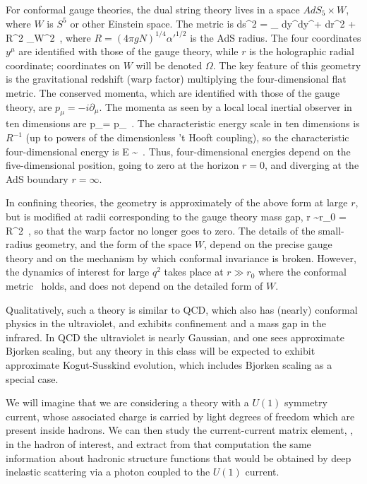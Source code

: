 For conformal gauge theories, the dual string theory lives in a space $AdS_5
\times W$, where $W$ is $S^5$ or other Einstein space.  The metric is
ds^2 =  \eta_{\mu\nu} dy^\mu dy^\nu + dr^2 + R^2
_W^2\ ,
\ee
where $R = (4\pi gN)^{1/4}
\alpha'^{1/2}$ is the AdS radius.  The four coordinates $y^\mu$ are
identified with those of the gauge theory, while $r$ is the holographic radial
coordinate; coordinates on $W$ will be denoted $\Omega$.  The key feature of
this geometry is the gravitational redshift (warp factor) multiplying the
four-dimensional flat metric.  The conserved momenta, which are identified
with those of the gauge theory, are $p_\mu = -i
\partial_\mu$.  The momenta as seen by a local local inertial observer in ten
dimensions are
\tilde p_\mu =  p_\mu\ .
\ee
The characteristic energy scale in ten dimensions is $R^{-1}$ (up to powers
of the dimensionless 't Hooft coupling), so the characteristic
four-dimensional energy is
E \sim {}\ .
\ee
Thus, four-dimensional energies depend on the five-dimensional position,
going to zero at the horizon $r = 0$, and diverging at the AdS boundary
$r = \infty$.

In confining theories, the geometry is approximately of the above form at
large $r$, but is modified at radii corresponding to the gauge theory mass
gap,
r \sim r_0 = \Lambda R^2\ ,
\ee
so that the warp factor no longer goes to zero.
The details of the small-radius geometry, and the form of the
space $W$, depend on the precise gauge theory and on the mechanism by which
conformal invariance is broken.  However, the dynamics of interest for large
$q^2$ takes place at $r \gg r_0$ where the conformal
metric~ holds, and does not depend on the detailed form of $W$.

Qualitatively, such a theory is similar to QCD, which
also has (nearly) conformal physics in the
ultraviolet, and exhibits confinement and a mass gap in the infrared.
In QCD the ultraviolet is nearly Gaussian, and one sees approximate
Bjorken scaling, but any theory in this class will be expected
to exhibit approximate Kogut-Susskind evolution, which includes
Bjorken scaling as a special case.

We will imagine that we are considering a theory with
a $U(1)$ symmetry current, whose associated
charge is carried by light degrees of freedom
which are present inside
hadrons.  We can then
study the current-current matrix element, , in the
hadron of interest, and extract from that computation
the same information about hadronic structure functions
that would be obtained by deep inelastic scattering via
a photon coupled to the $U(1)$ current.



